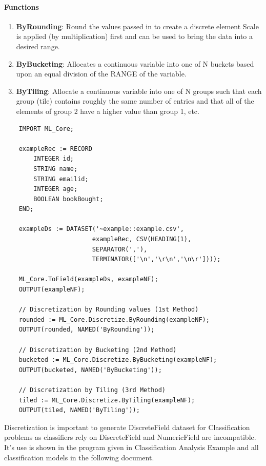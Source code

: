 \documentclass[a4paper,oneside,12pt]{book}
\begin{document}
\paragraph{Functions}

\begin{enumerate}
    \item \textbf{ByRounding}: Round the values passed in to create a discrete element Scale is applied (by multiplication) first and can be used to bring the data into a desired range.
    \item \textbf{ByBucketing}: Allocates a continuous variable into one of N buckets based upon an equal division of the RANGE of the variable.
    \item \textbf{ByTiling}: Allocate a continuous variable into one of N groups such that each group (tile) contains roughly the same number of entries and that all of the elements of group 2 have a higher value than group 1, etc.
\end{enumerate}

\begin{lstlisting}
    IMPORT ML_Core;
    
    exampleRec := RECORD
        INTEGER id;
        STRING name;
        STRING emailid;
        INTEGER age;
        BOOLEAN bookBought;
    END;
    
    exampleDs := DATASET('~example::example.csv', 
                        exampleRec, CSV(HEADING(1),
                        SEPARATOR(','),
                        TERMINATOR(['\n','\r\n','\n\r'])));
    
    ML_Core.ToField(exampleDs, exampleNF);
    OUTPUT(exampleNF);
    
    // Discretization by Rounding values (1st Method)
    rounded := ML_Core.Discretize.ByRounding(exampleNF);
    OUTPUT(rounded, NAMED('ByRounding'));
    
    // Discretization by Bucketing (2nd Method)
    bucketed := ML_Core.Discretize.ByBucketing(exampleNF);
    OUTPUT(bucketed, NAMED('ByBucketing'));
    
    // Discretization by Tiling (3rd Method)
    tiled := ML_Core.Discretize.ByTiling(exampleNF);
    OUTPUT(tiled, NAMED('ByTiling'));
\end{lstlisting}

Discretization is important to generate DiscreteField dataset for Classification problems as classifiers rely on DiscreteField and NumericField are incompatible. It's use is shown in the program given in Classification Analysis Example and all classification models in the following document.
\end{document}
